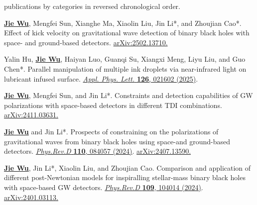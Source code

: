 


\begin{cvparagraph}
publications by categories in reversed chronological order.
\end{cvparagraph}

\begin{cvpublications}
\begin{pubitems} 
\item {\textbf{\underline{Jie Wu}}, Mengfei Sun, Xianghe Ma, Xiaolin Liu, Jin Li*, and Zhoujian Cao*. Effect of kick velocity on gravitational wave detection of binary black holes with space- and ground-based detectors. \href{https://arxiv.org/abs/2502.13710}{arXiv:2502.13710.}}
\item {Yalin Hu, \textbf{\underline{Jie Wu}}, Haiyan Luo, Guanqi Su, Xiangxi Meng, Liyu Liu, and Guo Chen*. Parallel manipulation of multiple ink droplets via near-infrared light on lubricant infused surface. \href{https://pubs.aip.org/aip/apl/article/126/2/021602/3330590}{\textit{Appl. Phys. Lett.} \textbf{126}, 021602 (2025)}.}
\item {\textbf{\underline{Jie Wu}}, Mengfei Sun, and Jin Li*. Constraints and detection capabilities of GW polarizations with space-based detectors in different TDI combinations. \href{https://arxiv.org/abs/2411.03631}{arXiv:2411.03631.}}
\item {\textbf{\underline{Jie Wu}} and Jin Li*. Prospects of constraining on the polarizations of gravitational waves from binary black holes using space-and ground-based detectors. \href{https://journals.aps.org/prd/abstract/10.1103/PhysRevD.110.084057}{\textit{Phys.Rev.D} \textbf{110}, 084057 (2024)}. \href{https://arxiv.org/abs/2407.13590}{arXiv:2407.13590.}}
\item \textbf{\underline{Jie Wu}}, Jin Li*, Xiaolin Liu, and Zhoujian Cao. Comparison and application of different post-Newtonian models for inspiralling stellar-mass binary black holes with space-based GW detectors. \href{https://journals.aps.org/prd/abstract/10.1103/PhysRevD.109.104014}{\textit{Phys.Rev.D} \textbf{109}, 104014 (2024)}. \href{https://arxiv.org/abs/2401.03113}{arXiv:2401.03113.}


\end{pubitems}
\end{cvpublications}
